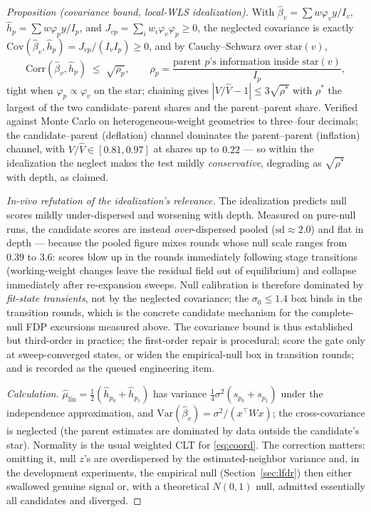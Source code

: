 \documentclass[11pt]{article}
\newcommand{\Var}{\mathrm{Var}}
\begin{document}
\emph{Proposition (covariance bound, local-WLS idealization).} With
$\hat\beta_v=\sum w\varphi_v y/I_v$, $\hat h_p=\sum w\varphi_p y/I_p$, and
$J_{vp}=\sum_i w_i\varphi_v\varphi_p\ge0$, the neglected covariance is
exactly $\mathrm{Cov}(\hat\beta_v,\hat h_p)=J_{vp}/(I_vI_p)\ge0$, and by
Cauchy--Schwarz over $\mathrm{star}(v)$,
\[
\mathrm{Corr}(\hat\beta_v,\hat h_p)\;\le\;\sqrt{\rho_p},\qquad
\rho_p=\frac{\text{parent $p$'s information inside }\mathrm{star}(v)}{I_p},
\]
tight when $\varphi_p\propto\varphi_v$ on the star; chaining gives
$|V/\hat V-1|\le3\sqrt{\rho^*}$ with $\rho^*$ the largest of the two
candidate--parent shares and the parent--parent share. Verified against
Monte Carlo on heterogeneous-weight geometries to three--four decimals; the
candidate--parent (deflation) channel dominates the parent--parent
(inflation) channel, with $V/\hat V\in[0.81,0.97]$ at shares up to $0.22$
--- so within the idealization the neglect makes the test mildly
\emph{conservative}, degrading as $\sqrt{\rho^*}$ with depth, as claimed.

\emph{In-vivo refutation of the idealization's relevance.} The idealization
predicts null scores mildly under-dispersed and worsening with depth.
Measured on pure-null runs, the candidate scores are instead
\emph{over}-dispersed pooled ($\mathrm{sd}\approx2.0$) and flat in depth ---
because the pooled figure mixes rounds whose null scale ranges from
$0.39$ to $3.6$: scores blow up in the rounds immediately following stage
transitions (working-weight changes leave the residual field out of
equilibrium) and collapse immediately after re-expansion sweeps. Null
calibration is therefore dominated by \emph{fit-state transients}, not by
the neglected covariance; the $\sigma_0\le1.4$ box binds in the transition
rounds, which is the concrete candidate mechanism for the complete-null FDP
excursions measured above. The covariance bound is thus established but
third-order in practice; the first-order repair is procedural; score the
gate only at sweep-converged states, or widen the empirical-null box in
transition rounds; and is recorded as the queued engineering item.
\begin{proof}[Calculation]
$\hat\mu_{\mathrm{lin}}=\tfrac12(\hat h_{p_0}+\hat h_{p_1})$ has variance
$\tfrac14\sigma^2(s_{p_0}+s_{p_1})$ under the independence approximation, and
$\Var(\hat\beta_v)=\sigma^2/(x^\top Wx)$; the cross-covariance is neglected (the parent
estimates are dominated by data outside the candidate's star). Normality is the usual
weighted CLT for \eqref{eq:coord}. The correction matters: omitting it, null $z$'s are
overdispersed by the estimated-neighbor variance and, in the development experiments,
the empirical null (Section~\ref{sec:lfdr}) then either swallowed genuine signal or,
with a theoretical $N(0,1)$ null, admitted essentially all candidates and diverged.
\end{proof}
\end{document}
